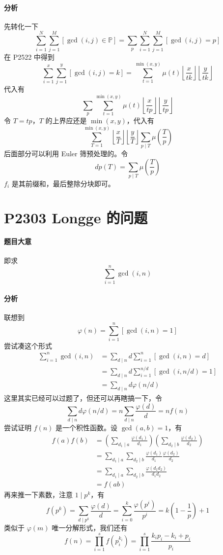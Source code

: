 \paragraph{分析}

先转化一下
\[ \sum_{i=1}^N \sum_{j=1}^M [\gcd(i,j) \in \mathbb{P}] = \sum_{p}\sum_{i=1}^N \sum_{j=1}^M [\gcd(i,j) = p] \]
在 P2522 中得到
\[ \sum_{i=1}^x \sum_{j=1}^y [\gcd(i,j) = k] = \sum_{t=1}^{\min(x,y)} \mu(t) \left\lfloor \frac{x}{tk} \right\rfloor \left\lfloor \frac{y}{tk} \right\rfloor \]
代入有
\[ \sum_{p} \sum_{t=1}^{\min(x,y)} \mu(t) \left\lfloor \frac{x}{tp} \right\rfloor \left\lfloor \frac{y}{tp} \right\rfloor \]
令 $T = tp$，$T$ 的上界应还是 $\min(x,y)$，代入有
\[ \sum_{T=1}^{\min(x,y)}  \left\lfloor \frac{x}{T} \right\rfloor \left\lfloor \frac{y}{T} \right\rfloor \sum_{p \mid T} \mu\left(\frac{T}{p}\right) \]
后面部分可以利用 Euler 筛预处理的。令
\[ dp(T) = \sum_{p \mid T} \mu\left(\frac{T}{p}\right) \]
$f_i$ 是其前缀和，最后整除分块即可。

\section{P2303 Longge 的问题}

\paragraph{题目大意}

即求
\[ \sum_{i=1}^n \gcd(i,n) \]

\paragraph{分析}

联想到
\[ \varphi(n) = \sum_{i=1}^n [\gcd(i,n) = 1] \]
尝试凑这个形式
\[ \begin{aligned}
\sum_{i=1}^n \gcd(i,n) &= \sum_{d \mid n} d \sum_{i=1}^n [\gcd(i,n) = d] \\
&= \sum_{d \mid n} d \sum_{i=1}^{n/d} [\gcd(i,n/d) = 1] \\
&= \sum_{d \mid n} d \varphi(n/d)
\end{aligned} \]
这里其实已经可以过题了，但还可以再瞎搞一下，令
\[ \sum_{d \mid n} d \varphi(n/d) = n\sum_{d \mid n} \frac{\varphi(d)}{d} = nf(n)\]
尝试证明 $f(n)$ 是一个积性函数。设 $\gcd(a,b) = 1$，有
\[ \begin{aligned}
f(a)f(b) &= \left(\sum_{d_1 \mid a} \frac{\varphi(d_1)}{d_1}\right) \left(\sum_{d_2 \mid b} \frac{\varphi(d_2)}{d_2}\right)\\
&= \sum_{d_1 \mid a} \sum_{d_2 \mid b} \frac{\varphi(d_1)}{d_1} \frac{\varphi(d_2)}{d_2}\\
&= \sum_{d_1 \mid a} \sum_{d_2 \mid b} \frac{\varphi(d_1d_2)}{d_1d_2}\\
&= f(ab)
\end{aligned} \]
再来推一下素数，注意 $1 \mid p^k$，有
\[ f(p^k) = \sum_{d \mid p^k} \frac{\varphi(d)}{d} = \sum_{i=0}^k \frac{\varphi(p^i)}{p^i} = k\left(1 - \frac{1}{p}\right) + 1 \]
类似于 $\varphi(m)$ 唯一分解形式，我们还有
\[ f(n) = \prod_{i=1}^sf(p_i^{k_i}) = \prod_{i=1}^s \frac{k_ip_i - k_i + p_i}{p_i} \]

